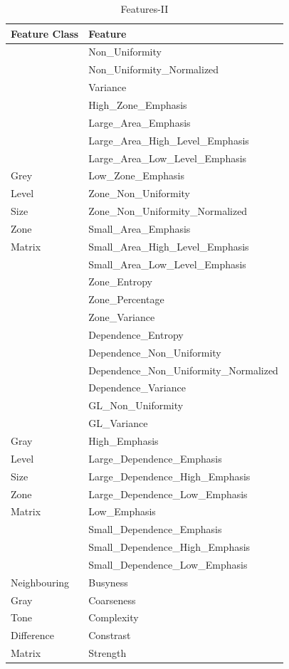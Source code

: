 \documentclass[10pt,journal,compsoc]{IEEEtran}
\begin{document}
\begin{table}[!b]
\scriptsize
\centering
\caption{Features-II}
\label{tb4}
\begin{tabular}{| l | l |}
\hline
\textbf{Feature Class} & \textbf{Feature}\\
\hline
&Non\_Uniformity\\
&Non\_Uniformity\_Normalized\\
&Variance\\
&High\_Zone\_Emphasis\\
&Large\_Area\_Emphasis\\
&Large\_Area\_High\_Level\_Emphasis\\
&Large\_Area\_Low\_Level\_Emphasis\\
Grey&Low\_Zone\_Emphasis\\
Level&Zone\_Non\_Uniformity\\
Size&Zone\_Non\_Uniformity\_Normalized\\
Zone&Small\_Area\_Emphasis\\
Matrix&Small\_Area\_High\_Level\_Emphasis\\
&Small\_Area\_Low\_Level\_Emphasis\\
&Zone\_Entropy\\
&Zone\_Percentage\\
&Zone\_Variance\\
\hline
&Dependence\_Entropy\\
&Dependence\_Non\_Uniformity\\
&Dependence\_Non\_Uniformity\_Normalized\\
&Dependence\_Variance\\
&GL\_Non\_Uniformity\\
&GL\_Variance\\
Gray &High\_Emphasis\\
Level &Large\_Dependence\_Emphasis\\
Size&Large\_Dependence\_High\_Emphasis\\
Zone&Large\_Dependence\_Low\_Emphasis\\
Matrix&Low\_Emphasis\\
&Small\_Dependence\_Emphasis\\
&Small\_Dependence\_High\_Emphasis\\
&Small\_Dependence\_Low\_Emphasis\\
\hline
Neighbouring&Busyness\\
Gray&Coarseness\\
Tone&Complexity\\
Difference&Constrast\\
Matrix&Strength\\
\hline
\end{tabular}
\end{table}
\end{document}
